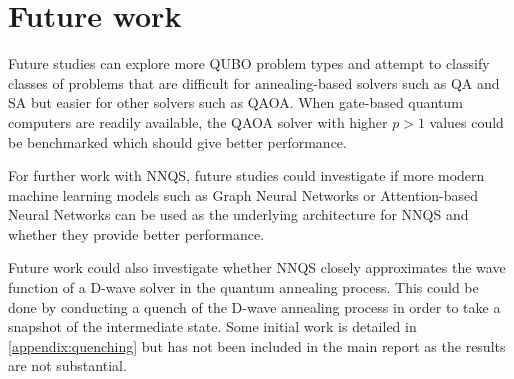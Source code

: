 \section{Future work}
Future studies can explore more QUBO problem types and attempt to classify classes of problems that are difficult for annealing-based solvers such as QA and SA but easier for other solvers such as QAOA. When gate-based quantum computers are readily available, the QAOA solver with higher $p > 1$ values could be benchmarked which should give better performance.

For further work with NNQS, future studies could investigate if more modern machine learning models such as Graph Neural Networks or Attention-based Neural Networks can be used as the underlying architecture for NNQS and whether they provide better performance.

Future work could also investigate whether NNQS closely approximates the wave function of a D-wave solver in the quantum annealing process. This could be done by conducting a quench of the D-wave annealing process in order to take a snapshot of the intermediate state. Some initial work is detailed in \autoref{appendix:quenching} but has not been included in the main report as the results are not substantial.